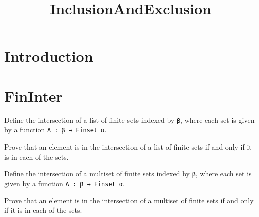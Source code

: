 \title{InclusionAndExclusion}




\maketitle


\tableofcontents

\nocite{*} %

\section{Introduction}


\section{FinInter}

\begin{definition}\label{List.FinInter}
  \leanok
  Define the intersection of a list of finite sets indexed by \verb|β|, where each set is given by a function \verb|A : β → Finset α|.
\end{definition}

\begin{lemma}\label{List.eq_FinInter}
  Prove that an element is in the intersection of a list of finite sets if and only if it is in each of the sets.
\end{lemma}

\begin{definition}\label{Multiset.FinInter}
  Define the intersection of a multiset of finite sets indexed by \verb|β|, where each set is given by a function \verb|A : β → Finset α|.
\end{definition}

\begin{lemma}\label{Multiset.eq_FinInter}
  Prove that an element is in the intersection of a multiset of finite sets if and only if it is in each of the sets.
\end{lemma}

